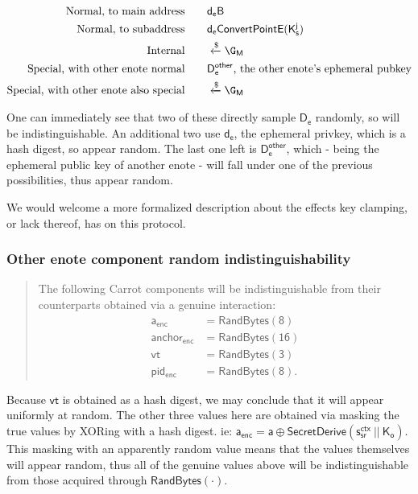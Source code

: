 \documentclass{article}
\theoremstyle{definition}
\newcommand{\6}{\mathbf}
\newcommand{\7}{\mathcal}
\newcommand{\secr}[1]{{\mathsf{SecretDerive}(\sf{#1})}}
\renewcommand{\sf}[1]{{\mathsf{#1}}}
\begin{document}
\begin{align*}
    \text{Normal, to main address} \quad & \quad \sf{d_e B} \\
    \text{Normal, to subaddress} \quad & \quad \sf{d_e ConvertPointE(K_s^j)} \\
    \text{Internal} \quad & \quad \xleftarrow{\$} \G_\sf{M} \\ 
    \text{Special, with other enote normal} \quad & \quad \sf{D_e^{other}} \text{, the other enote's ephemeral pubkey} \\
    \text{Special, with other enote also special} \quad & \quad \xleftarrow{\$} \G_\sf{M} 
\end{align*}

One can immediately see that two of these directly sample $\sf{D_e}$ randomly, so will be indistinguishable. An additional two use $\sf{d_e}$, the ephemeral privkey, which is a hash digest, so appear random. The last one left is $\sf{D_e^{other}}$, which - being the ephemeral public key of another enote - will fall under one of the previous possibilities, thus appear random.
\medskip 

We would welcome a more formalized description about the effects key clamping, or lack thereof, has on this protocol. 





\subsubsection{Other enote component random indistinguishability} 

\begin{quote}
        The following Carrot components will be indistinguishable from their counterparts obtained via a genuine interaction: 
        \begin{align*}
            \sf{a_{enc}} &= \sf{RandBytes(8)} \\
            \sf{anchor_{enc}} &= \sf{RandBytes(16)} \\
            \sf{vt} &= \sf{RandBytes(3)} \\
            \sf{pid_{enc}} &= \sf{RandBytes(8)}.
        \end{align*}
\end{quote}

Because $\sf{vt}$ is obtained as a hash digest, we may conclude that it will appear uniformly at random. The other three values here are obtained via masking the true values by XORing with a hash digest. ie: $\sf{a_{enc} = a \oplus \secr{s_{sr}^{ctx} \ || \ K_o}}$. This masking with an apparently random value means that the values themselves will appear random, thus all of the genuine values above will be indistinguishable from those acquired through $\sf{RandBytes(\cdot)}$.





\end{document}
